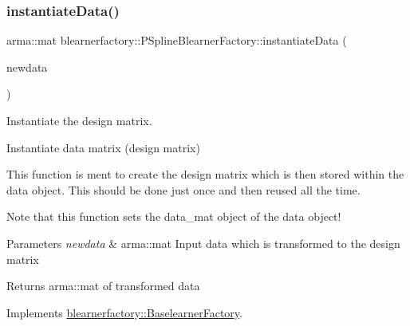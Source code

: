 \subsubsection{\texorpdfstring{instantiate\+Data()}{instantiateData()}}
{\footnotesize\ttfamily arma\+::mat blearnerfactory\+::\+P\+Spline\+Blearner\+Factory\+::instantiate\+Data (\begin{DoxyParamCaption}\item[{const arma\+::mat \&}]{newdata }\end{DoxyParamCaption})\hspace{0.3cm}{\ttfamily [virtual]}}



Instantiate the design matrix. 

Instantiate data matrix (design matrix)

This function is ment to create the design matrix which is then stored within the data object. This should be done just once and then reused all the time.

Note that this function sets the {\ttfamily data\+\_\+mat} object of the data object!


\begin{DoxyParams}{Parameters}
{\em newdata} & {\ttfamily arma\+::mat} Input data which is transformed to the design matrix\\
\hline
\end{DoxyParams}
\begin{DoxyReturn}{Returns}
{\ttfamily arma\+::mat} of transformed data 
\end{DoxyReturn}


Implements \mbox{\hyperlink{classblearnerfactory_1_1_baselearner_factory_ac4a38c4815fb33b8d4785745117c5e57}{blearnerfactory\+::\+Baselearner\+Factory}}.

